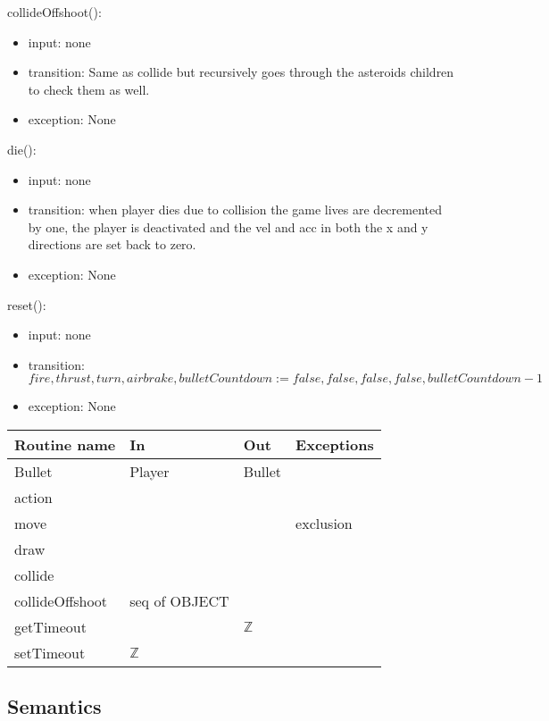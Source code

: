\documentclass[12pt]{article}
\begin{document}
\noindent collideOffshoot():
\begin{itemize}
  \item input: none
  \item transition: Same as collide but recursively goes through the asteroids children to check them as well.
  \item exception: None
\end{itemize}

\noindent die():
\begin{itemize}
  \item input: none
  \item transition: when player dies due to collision the game lives are decremented by one, the player is deactivated and the vel and acc in both the x and y directions are set back to zero.
  \item exception: None
\end{itemize}

\noindent reset():
\begin{itemize}
  \item input: none
  \item transition: $fire, thrust, turn, airbrake, bulletCountdown := false, false, false, false, bulletCountdown - 1$
  \item exception: None
\end{itemize}

\newpage

\begin{tabular}{| l | l | l | l |}
    \hline
    \textbf{Routine name} & \textbf{In} & \textbf{Out} & \textbf{Exceptions}\\
    \hline
    Bullet & Player & Bullet & ~\\
    \hline
    action & ~ & ~ & ~\\
    \hline
    move & ~ & ~ & exclusion\\
    \hline
    draw & ~ & ~ & ~\\
    \hline
    collide & ~ & ~ & ~\\
    \hline
    collideOffshoot & seq of OBJECT & ~ & ~\\
    \hline
    getTimeout & ~ & $\mathbb{Z}$ & ~\\
    \hline
    setTimeout & $\mathbb{Z}$ & ~ & ~\\
    \hline
    
\end{tabular}

\subsection* {Semantics}
\end{document}
